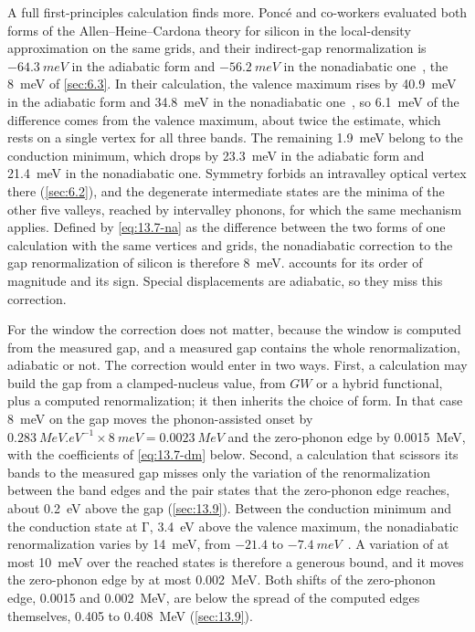 A full first-principles calculation finds more. Poncé and co-workers evaluated both forms of the Allen--Heine--Cardona theory for silicon in the local-density approximation on the same grids, and their indirect-gap renormalization is $-\SI{64.3}{meV}$ in the adiabatic form and $-\SI{56.2}{meV}$ in the nonadiabatic one~\cite[Table~VI]{ponce2015temperature}, the \SI{8}{meV} of \cref{sec:6.3}. In their calculation, the valence maximum rises by \SI{40.9}{meV} in the adiabatic form and \SI{34.8}{meV} in the nonadiabatic one~\cite[Sect.~VI\,A\,2]{ponce2015temperature}, so \SI{6.1}{meV} of the difference comes from the valence maximum, about twice the estimate, which rests on a single vertex for all three bands. The remaining \SI{1.9}{meV} belong to the conduction minimum, which drops by \SI{23.3}{meV} in the adiabatic form and \SI{21.4}{meV} in the nonadiabatic one. Symmetry forbids an intravalley optical vertex there (\cref{sec:6.2}), and the degenerate intermediate states are the minima of the other five valleys, reached by intervalley phonons, for which the same mechanism applies. Defined by \cref{eq:13.7-na} as the difference between the two forms of one calculation with the same vertices and grids, the nonadiabatic correction to the gap renormalization of silicon is therefore \SI{8}{meV}.  accounts for its order of magnitude and its sign. Special displacements are adiabatic, so they miss this correction.

For the window the correction does not matter, because the window is computed from the measured gap, and a measured gap contains the whole renormalization, adiabatic or not. The correction would enter in two ways. First, a calculation may build the gap from a clamped-nucleus value, from $GW$ or a hybrid functional, plus a computed renormalization; it then inherits the choice of form. In that case \SI{8}{meV} on the gap moves the phonon-assisted onset by $\SI{0.283}{MeV.eV^{-1}}\times\SI{8}{meV} = \SI{0.0023}{MeV}$ and the zero-phonon edge by \SI{0.0015}{MeV}, with the coefficients of \cref{eq:13.7-dm} below. Second, a calculation that scissors its bands to the measured gap misses only the variation of the renormalization between the band edges and the pair states that the zero-phonon edge reaches, about \SI{0.2}{eV} above the gap (\cref{sec:13.9}). Between the conduction minimum and the conduction state at $\mathrm{\Gamma}$, \SI{3.4}{eV} above the valence maximum, the nonadiabatic renormalization varies by \SI{14}{meV}, from $-21.4$ to $-\SI{7.4}{meV}$~\cite[Table~VI and Sect.~VI\,A\,2]{ponce2015temperature}. A variation of at most \SI{10}{meV} over the reached states is therefore a generous bound, and it moves the zero-phonon edge by at most \SI{0.002}{MeV}. Both shifts of the zero-phonon edge, 0.0015 and \SI{0.002}{MeV}, are below the spread of the computed edges themselves, 0.405 to \SI{0.408}{MeV} (\cref{sec:13.9}).

